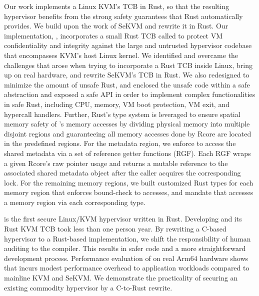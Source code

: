 Our work implements a Linux KVM's TCB in Rust, so that the resulting hypervisor
benefits from the strong safety guarantees that Rust automatically provides.
We build upon the work of SeKVM \cite{sekvm} and rewrite it in Rust.
Our implementation, \rustsec{}, incorporates a small Rust TCB called \rustcore{} to
protect VM confidentiality and integrity against the large and untrusted
hypervisor codebase that encompasses KVM’s host Linux kernel.
We identified and overcame the challenges that arose when trying to
incorporate a Rust TCB inside Linux, bring up \rustsec{} on real hardware, and
rewrite SeKVM's TCB in Rust.
We also redesigned \rustcore{} to minimize the amount of unsafe Rust,
and enclosed the unsafe code within a safe abstraction and exposed a safe API
in order to implement complex functionalities in safe Rust, including CPU,
memory, VM boot protection, VM exit, and hypercall handlers.
Further, Rust’s type system is leveraged to ensure spatial memory safety of
\rustcore{}’s memory accesses by dividing physical memory into multiple
disjoint regions and guaranteeing all memory accesses done by Rcore are located
in the predefined regions.
For the \rustcore{} metadata region, we enforce \rustcore{} to access the
shared metadata via a set of reference getter functions (RGF).
Each RGF wraps a given Rcore’s raw pointer usage and returns a mutable
reference to the associated shared metadata object after the caller acquires
the corresponding lock.
For the remaining memory regions, we built
customized Rust types for each memory region that
enforces bound-check to accesses, and mandate that \rustcore{} accesses a
memory region via each corresponding type.

\rustsec{} is the first secure Linux/KVM hypervisor written in Rust.
Developing \rustsec{} and its Rust KVM TCB took less than one person year.
By rewriting a C-based hypervisor to a Rust-based implementation,
we shift the responsibility of human auditing to the compiler.
This results in safer code and a more straightforward development process.
Performance evaluation of \rustsec{} on real Arm64 hardware shows that
\rustsec{} incurs modest performance overhead to application workloads
compared to mainline KVM and SeKVM. We demonstrate the practicality of
securing an existing commodity hypervisor by a C-to-Rust rewrite.

